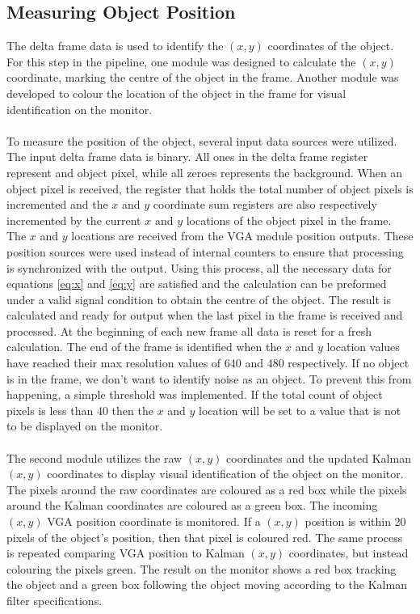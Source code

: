 \documentclass[11pt]{article} %
\begin{document}
\subsection{Measuring Object Position}
The delta frame data is used to identify the $(x,y)$ coordinates of the object. For this step in the pipeline, one module was designed to calculate the $(x,y)$ coordinate, marking the centre of the object in the frame. Another module was developed to colour the location of the object in the frame for visual identification on the monitor. \\\\
To measure the position of the object, several input data sources were utilized. The input delta frame data is binary. All ones in the delta frame register represent and object pixel, while all zeroes represents the background. When an object pixel is received, the register that holds the total number of object pixels is incremented and the $x$ and $y$ coordinate sum registers are also respectively incremented by the current $x$ and $y$ locations of the object pixel in the frame. The $x$ and $y$ locations are received from the VGA module position outputs. These position sources were used instead of internal counters to ensure that processing is synchronized with the output. Using this process, all the necessary data for equations \ref{eq:x} and \ref{eq:y} are satisfied and the calculation can be preformed under a valid signal condition to obtain the centre of the object. The result is calculated and ready for output when the last pixel in the frame is received and processed. At the beginning of each new frame all data is reset for a fresh calculation. The end of the frame is identified when the $x$ and $y$ location values have reached their max resolution values of 640 and 480 respectively. If no object is in the frame, we don't want to identify noise as an object. To prevent this from happening, a simple threshold was implemented. If the total count of object pixels is less than 40 then the $x$ and $y$ location will be set to a value that is not to be displayed on the monitor. \\\\
The second module utilizes the raw $(x,y)$ coordinates and the updated Kalman $(x,y)$ coordinates to display visual identification of the object on the monitor. The pixels around the raw coordinates are coloured as a red box while the pixels around the Kalman coordinates are coloured as a green box. The incoming $(x,y)$ VGA position coordinate is monitored. If a $(x,y)$ position is within 20 pixels of the object's position, then that pixel is coloured red. The same process is repeated comparing VGA position to Kalman $(x,y)$ coordinates, but instead colouring the pixels green. The result on the monitor shows a red box tracking the object and a green box following the object moving according to the Kalman filter specifications. 
\end{document}
